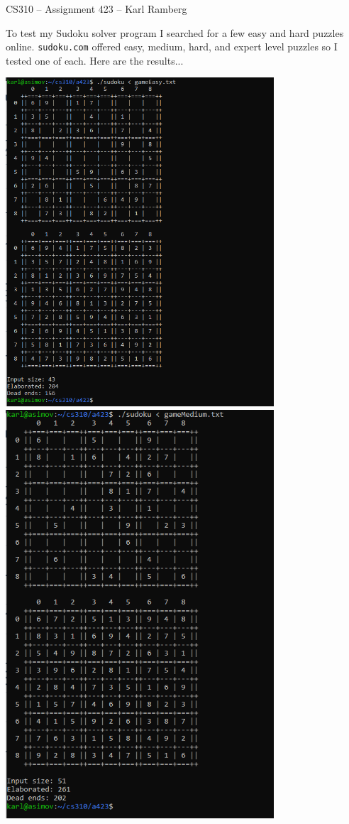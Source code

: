 \documentclass[11pt]{article}
\begin{document}
\begin{center}
    CS310 -- Assignment 423 -- Karl Ramberg
\end{center}

To test my Sudoku solver program I searched for a few easy and hard puzzles online. \texttt{sudoku.com} offered easy, medium, hard, and expert level puzzles so I tested one of each. Here are the results...

\begin{center}
    \includegraphics[width=0.75\textwidth]{easy.png} 
    \includegraphics[width=0.75\textwidth]{medium.png} 

\end{center}
\end{document}
